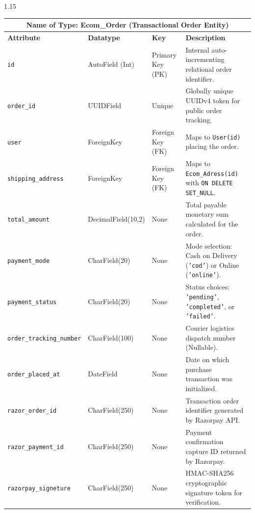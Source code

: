 \documentclass[12pt,a4paper]{article}
\begin{document}
{\begin{spacing}{1.15}
\vspace{1.0in}



\begin{center}
\renewcommand{\arraystretch}{1.15}
\fontsize{9}{12}\selectfont
\begin{tabular}{|p{1.4in}|p{1.1in}|p{0.8in}|p{2.9in}|}
\hline
\multicolumn{4}{|c|}{\textbf{\fontsize{10}{13}\selectfont Name of Type: Ecom\_Order (Transactional Order Entity)}} \\ \hline
\textbf{Attribute} & \textbf{Datatype} & \textbf{Key} & \textbf{Description} \\ \hline
\texttt{id} & AutoField (Int) & Primary Key (PK) & Internal auto-incrementing relational order identifier. \\ \hline
\texttt{order\_id} & UUIDField & Unique & Globally unique UUIDv4 token for public order tracking. \\ \hline
\texttt{user} & ForeignKey & Foreign Key (FK) & Maps to \texttt{User(id)} placing the order. \\ \hline
\texttt{shipping\_address} & ForeignKey & Foreign Key (FK) & Maps to \texttt{Ecom\_Adress(id)} with \texttt{ON DELETE SET\_NULL}. \\ \hline
\texttt{total\_amount} & DecimalField(10,2) & None & Total payable monetary sum calculated for the order. \\ \hline
\texttt{payment\_mode} & CharField(20) & None & Mode selection: Cash on Delivery (\texttt{'cod'}) or Online (\texttt{'online'}). \\ \hline
\texttt{payment\_status} & CharField(20) & None & Status choices: \texttt{'pending'}, \texttt{'completed'}, or \texttt{'failed'}. \\ \hline
\texttt{order\_tracking\_number} & CharField(100) & None & Courier logistics dispatch number (Nullable). \\ \hline
\texttt{order\_placed\_at} & DateField & None & Date on which purchase transaction was initialized. \\ \hline
\texttt{razor\_order\_id} & CharField(250) & None & Transaction order identifier generated by Razorpay API. \\ \hline
\texttt{razor\_payment\_id} & CharField(250) & None & Payment confirmation capture ID returned by Razorpay. \\ \hline
\texttt{razorpay\_signeture} & CharField(250) & None & HMAC-SHA256 cryptographic signature token for verification. \\ \hline
\end{tabular}
\end{center}


\end{spacing}}
\end{document}
